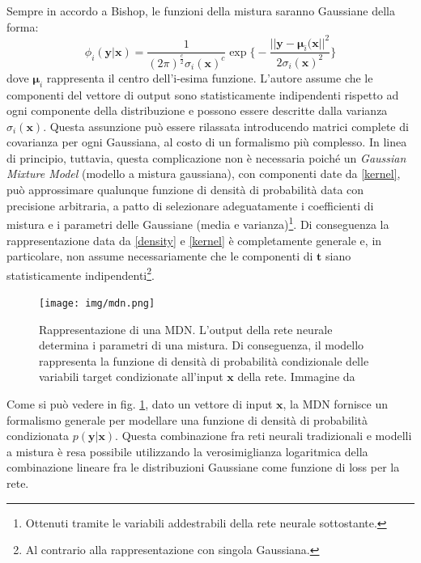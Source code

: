 Sempre in accordo a Bishop, le funzioni della mistura saranno Gaussiane della forma:
\begin{equation}
	\label{kernel}
	\phi_i(\boldsymbol{y} | \boldsymbol{x}) = \frac{1}{(2\pi)^{\frac{c}{2}}\sigma_i(\boldsymbol{x})^c} \exp\bigg\{-\frac{||\boldsymbol{y} - \boldsymbol{\mu}_i(\boldsymbol{x}||^2}{2\sigma_i(\boldsymbol{x})^2}\bigg\}
\end{equation}
dove $\boldsymbol{\mu}_i$ rappresenta il centro dell'i-esima funzione. L'autore assume che le componenti del vettore di output sono statisticamente indipendenti rispetto ad ogni componente della distribuzione e possono essere descritte dalla varianza $\sigma_i(\boldsymbol{x})$. Questa assunzione può essere rilassata introducendo matrici complete di covarianza per ogni Gaussiana, al costo di un formalismo più complesso. In linea di principio, tuttavia, questa complicazione non è necessaria poiché un \textit{Gaussian Mixture Model} (modello a mistura gaussiana), con componenti date da \ref{kernel}, può approssimare qualunque funzione di densità di probabilità data con precisione arbitraria, a patto di selezionare adeguatamente i coefficienti di mistura e i parametri delle Gaussiane (media e varianza)\footnote{Ottenuti tramite le variabili addestrabili della rete neurale sottostante.}. Di conseguenza la rappresentazione data da \ref{density} e \ref{kernel} è completamente generale e, in particolare, non assume necessariamente che le componenti di $\boldsymbol{t}$ siano statisticamente indipendenti\footnote{Al contrario alla rappresentazione con singola Gaussiana.}.
\begin{figure}[ht]
	\centering
	\texttt{[image: img/mdn.png]}
	\caption{Rappresentazione di una MDN. L'output della rete neurale determina i parametri di una mistura. Di conseguenza, il modello rappresenta la funzione di densità di probabilità condizionale delle variabili target condizionate all'input $\boldsymbol{x}$ della rete. Immagine da \cite{MDN}}
	\label{fig:1.22}
\end{figure}

Come si può vedere in fig. \ref{fig:1.22}, dato un vettore di input $\boldsymbol{x}$, la MDN fornisce un formalismo generale per modellare una funzione di densità di probabilità condizionata $p(\boldsymbol{y} | \boldsymbol{x})$. Questa combinazione fra reti neurali tradizionali e modelli a mistura è resa possibile utilizzando la verosimiglianza logaritmica della combinazione lineare fra le distribuzioni Gaussiane come funzione di loss per la rete.

